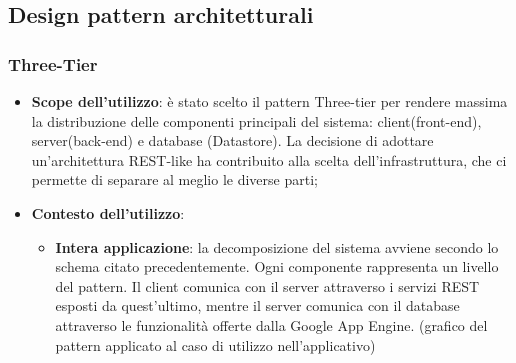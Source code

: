 %


\subsection{Design pattern architetturali} %
\label{sub:design_pattern_architetturali}
	\subsubsection{Three-Tier} %
	\label{ssub:three_tier}
		\begin{itemize}
			\item \textbf{Scope dell'utilizzo}: è stato scelto il pattern Three-tier per rendere massima la distribuzione delle componenti principali del sistema: client(front-end), server(back-end) e database (Datastore). La decisione di adottare un'architettura REST-like ha contribuito alla scelta dell'infrastruttura, che ci permette di separare al meglio le diverse parti;
			\item \textbf{Contesto dell'utilizzo}:
				\begin{itemize}
					\item \textbf{Intera applicazione}: la decomposizione del sistema avviene secondo lo schema citato precedentemente. Ogni componente rappresenta un livello del pattern. Il client comunica con il server attraverso i servizi REST esposti da quest'ultimo, mentre il server comunica con il database attraverso le funzionalità offerte dalla Google App Engine. \newline
					[TO DO] (grafico del pattern applicato al caso di utilizzo nell'applicativo)
				\end{itemize}
		\end{itemize}


